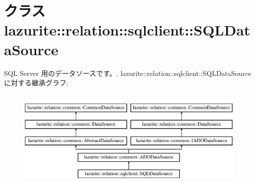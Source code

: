 \hypertarget{classlazurite_1_1relation_1_1sqlclient_1_1_s_q_l_data_source}{
\section{クラス lazurite::relation::sqlclient::SQLDataSource}
\label{classlazurite_1_1relation_1_1sqlclient_1_1_s_q_l_data_source}
}


SQL Server 用のデータソースです。.  
lazurite::relation::sqlclient::SQLDataSourceに対する継承グラフ:\begin{figure}[H]
\begin{center}
\leavevmode
\includegraphics[height=4.96454cm]{classlazurite_1_1relation_1_1sqlclient_1_1_s_q_l_data_source}
\end{center}
\end{figure}
